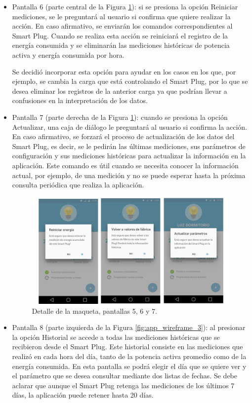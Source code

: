 \begin{itemize}
\item Pantalla 6 (parte central de la Figura \ref{fig:app_wireframe_2}): si se presiona la opción Reiniciar mediciones, se le preguntará al usuario si confirma que quiere realizar la acción. En caso afirmativo, se enviarán los comandos correspondientes al Smart Plug. Cuando se realiza esta acción se reiniciará el registro de la energía consumida y se eliminarán las mediciones históricas de potencia activa y energía consumida por hora. 

Se decidió incorporar esta opción para ayudar en los casos en los que, por ejemplo, se cambia la carga que está controlando el Smart Plug, por lo que se desea eliminar los registros de la anterior carga ya que podrían llevar a confusiones en la interpretación de los datos.

\item Pantalla 7 (parte derecha de la Figura \ref{fig:app_wireframe_2}): cuando se presiona la opción Actualizar, una caja de diálogo le preguntará al usuario si confirma la acción. En caso afirmativo, se forzará el proceso de actualización de los datos del Smart Plug, es decir, se le pedirán las últimas mediciones, sus parámetros de configuración y sus mediciones históricas para actualizar la información en la aplicación. Este comando es útil cuando se necesita conocer la información actual, por ejemplo, de una medición y no se puede esperar hasta la próxima consulta periódica que realiza la aplicación.


\begin{figure}[!h]
	\centering
	\includegraphics[width=14cm]{./Figures/3_3_1_app_wireframe_2.png}
	\caption{Detalle de la maqueta, pantallas 5, 6 y 7.}
	\label{fig:app_wireframe_2}
\end{figure}


\item Pantalla 8 (parte izquierda de la Figura \ref{fig:app_wireframe_3}): al presionar la opción Historial se accede a todas las mediciones históricas que se recibieron desde el Smart Plug. Este historial consiste en las mediciones que realizó en cada hora del día, tanto de la potencia activa promedio como de la energía consumida. En esta pantalla se podrá elegir el día que se quiere ver y el parámetro que se desea consultar mediante dos listas de fechas. Se debe aclarar que aunque el Smart Plug retenga las mediciones de los últimos 7 días, la aplicación puede retener hasta 20 días.


\end{itemize}
